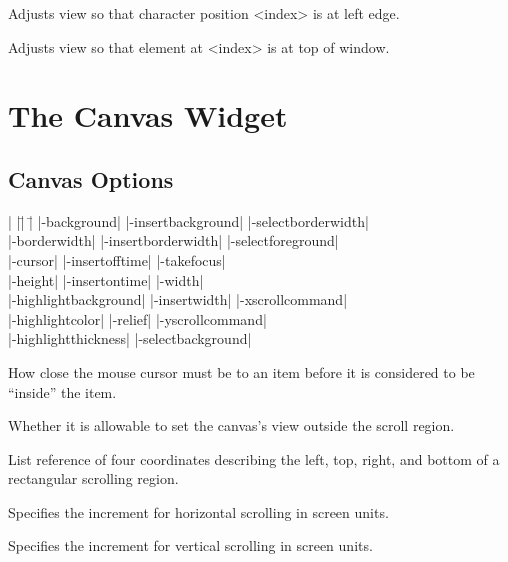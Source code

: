 \begin{enum}{1cm}

Adjusts view so that character position <index> is at left edge.

Adjusts view so that element at <index> is at top of window.

\end{enum}


\section{The Canvas Widget}

\subsection*{Canvas Options}
\begin{tabbing}
|                      |\=|                   |\= \kill
|-background|          \> |-insertbackground|   \> |-selectborderwidth|  \\
|-borderwidth|         \> |-insertborderwidth|  \> |-selectforeground| \\
|-cursor|    	       \> |-insertofftime|      \> |-takefocus|  \\
|-height|	       \> |-insertontime|       \> |-width| \\
|-highlightbackground| \> |-insertwidth|        \> |-xscrollcommand|    \\
|-highlightcolor|      \> |-relief|             \> |-yscrollcommand| \\
|-highlightthickness|  \> |-selectbackground|  \\
\end{tabbing}

\vskip5pt
\begin{enum}{1cm}

How close the mouse cursor must be to an item before it is considered
to be ``inside'' the item.

Whether it is allowable to set the canvas's view outside the scroll
region.

List reference of four coordinates describing the left, top, right, and bottom
of a rectangular scrolling region.

Specifies the increment for horizontal scrolling in screen units.

Specifies the increment for vertical scrolling in screen units.

\end{enum}

